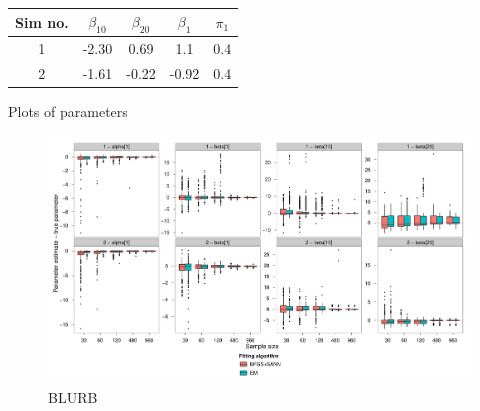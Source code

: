 \begin{table}[ht]
\centering
\begin{tabular}{c c c c c}
Sim no. & $\beta_{10}$ & $\beta_{20}$ & $\beta_1$ & $\pi_1$\\
\hline
\hline
1 & -2.30 &  0.69 &  1.1  & 0.4 \\
2 & -1.61 & -0.22 & -0.92 & 0.4 \\
\end{tabular}
\label{mmds-cov-simtable}
\caption{}
\end{table}



Plots of parameters

\begin{figure}
\centering
\includegraphics[width=6.84in]{mix/figs/cov-boxplots.pdf}
\caption{BLURB}
\label{mmds-cov-boxplots}
\end{figure}

